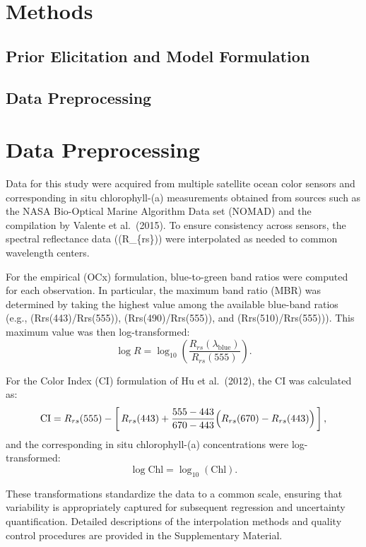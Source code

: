 \documentclass[
]{agujournal2019}
\begin{document}
\section{Methods}\label{methods}

\subsection{Prior Elicitation and Model
Formulation}\label{prior-elicitation-and-model-formulation}

\subsection{Data Preprocessing}\label{data-preprocessing}

\subsection{}\label{section}

\section{Data Preprocessing}

Data for this study were acquired from multiple satellite ocean color
sensors and corresponding in situ chlorophyll-(a) measurements obtained
from sources such as the NASA Bio-Optical Marine Algorithm Data set
(NOMAD) and the compilation by Valente et al.~(2015). To ensure
consistency across sensors, the spectral reflectance data ((R\_\{rs\}))
were interpolated as needed to common wavelength centers.

For the empirical (OCx) formulation, blue-to-green band ratios were
computed for each observation. In particular, the maximum band ratio
(MBR) was determined by taking the highest value among the available
blue-band ratios (e.g., (Rrs(443)/Rrs(555)), (Rrs(490)/Rrs(555)), and
(Rrs(510)/Rrs(555))). This maximum value was then log-transformed: \[
\log R = \log_{10}\left(\frac{R_{rs}(\lambda_{\text{blue}})}{R_{rs}(555)}\right).
\]

For the Color Index (CI) formulation of Hu et al.~(2012), the CI was
calculated as: \[
\text{CI} = R_{rs}(555) - \left[\,R_{rs}(443) + \frac{555-443}{670-443}\Bigl(R_{rs}(670) - R_{rs}(443)\Bigr)\,\right],
\] and the corresponding in situ chlorophyll-(a) concentrations were
log-transformed: \[
\log \text{Chl} = \log_{10}(\text{Chl}).
\]

These transformations standardize the data to a common scale, ensuring
that variability is appropriately captured for subsequent regression and
uncertainty quantification. Detailed descriptions of the interpolation
methods and quality control procedures are provided in the Supplementary
Material.
\end{document}
